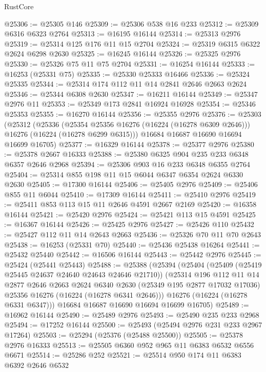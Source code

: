 \begin{lexlean}{RustCore}
\begin{coremodule}
@25306 := @25305 @146
@25309 := @25306 @538 @16 @233
@25312 := @25309 @6316 @6323 @2764
@25313 := @16195 @16144
@25314 := @25313 @2976
@25319 := @25314 @125 @176 @11 @15 @2704
@25324 := @25319 @6315 @6322 @2624 @6298 @2630
@25325 := @16245 @16144
@25326 := @25325 @2976
@25330 := @25326 @75 @11 @75 @2704
@25331 := @16254 @16144
@25333 := @16253 (@25331 @75)
@25335 := @25330 @25333 @16466
@25336 := @25324 @25335
@25344 := @25314 @174 @112 @11 @14 @2841 @2646 @2663 @2624
@25346 := @25344 @6308 @2630
@25347 := @16211 @16144
@25349 := @25347 @2976 @11
@25353 := @25349 @173 @2841 @16924 @16928
@25354 := @25346 @25353
@25355 := @16270 @16144
@25356 := @25355 @2976
@25376 := @25303
    (@25312
      (@25336
        (@25354 @25356 @16276 (@16224 (@16278 @6309 @2646)))
        @16276
        (@16224 (@16278 @6299 @6315)))
      @16684
      @16687
      @16690
      @16694
      @16699
      @16705)
@25377 := @16329 @16144
@25378 := @25377 @2976
@25380 := @25378 @2667 @16333
@25388 := @25380 @6325 @904 @235 @233 @6348 @6357 @2646 @2968
@25394 := @25306 @903 @16 @233 @6348 @6355 @2764
@25404 := @25314 @855 @198 @11 @15 @6044 @6347 @6354 @2624 @6330 @2630
@25405 := @17300 @16144
@25406 := @25405 @2976
@25409 := @25406 @855 @11 @6044
@25410 := @17309 @16144
@25411 := @25410 @2976
@25419 := @25411 @853 @113 @15 @11 @2646 @4591 @2667 @2169
@25420 := @16358 @16144
@25421 := @25420 @2976
@25424 := @25421 @113 @15 @4591
@25425 := @16367 @16144
@25426 := @25425 @2976
@25427 := @25426 @110
@25432 := @25427 @112 @11 @14 @2643 @2663
@25436 := @25326 @70 @11 @70 @2643
@25438 := @16253 (@25331 @70)
@25440 := @25436 @25438 @16264
@25441 := @25432 @25440
@25442 := @16506 @16144
@25443 := @25442 @2976
@25445 := @25424 (@25441 @25443)
@25488 := @25388
    (@25394
      (@25404
        (@25409 (@25419 @25445 @24637 @24640 @24643 @24646 @21710))
        (@25314
          @196
          @112
          @11
          @14
          @2877
          @2646
          @2663
          @2624
          @6340
          @2630
          (@25349 @195 @2877 @17032 @17036)
          @25356
          @16276
          (@16224 (@16278 @6341 @2646)))
        @16276
        (@16224 (@16278 @6331 @6347)))
      @16684
      @16687
      @16690
      @16694
      @16699
      @16705)
@25489 := @16962 @16144
@25490 := @25489 @2976
@25493 := @25490 @235 @233 @2968
@25494 := @17252 @16144
@25500 := @25493 (@25494 @2976 @231 @233 @2967 @17264)
@25503 := @25294 (@25376 (@25488 @25500))
@25505 := @25378 @2976 @16333
@25513 := @25505 @6360 @952 @965 @11 @6383 @6532 @6556 @6671
@25514 := @25286 @252
@25521 := @25514 @950 @174 @11 @6383 @6392 @2646 @6532

\end{coremodule}
\end{lexlean}
